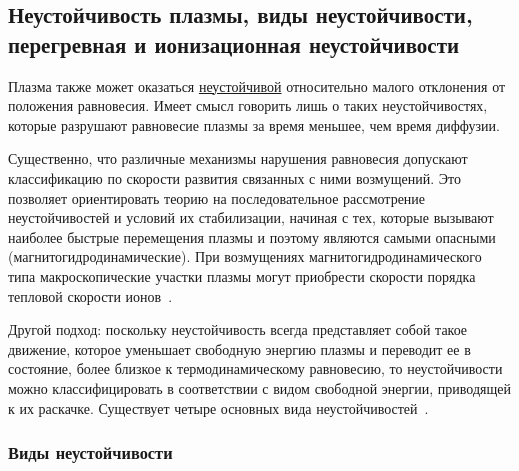 \documentclass[10pt, a4paper]{article}
\begin{document}
\subsection{Неустойчивость плазмы, виды неустойчивости, перегревная и ионизационная неустойчивости}

Плазма также может оказаться
\uline{неустойчивой} относительно малого отклонения от положения равновесия. Имеет смысл говорить лишь о таких неустойчивостях, которые разрушают равновесие плазмы за время меньшее, чем время диффузии.

Существенно, что различные механизмы нарушения равновесия допускают классификацию по скорости развития связанных с ними возмущений. Это позволяет ориентировать теорию на последовательное рассмотрение неустойчивостей и условий их стабилизации, начиная с тех, которые вызывают наиболее быстрые перемещения плазмы и поэтому являются самыми опасными (магнитогидродинамические). При возмущениях магнитогидродинамического типа макроскопические участки плазмы могут приобрести скорости порядка тепловой скорости ионов~\cite{arzimovich}. 

Другой подход: поскольку неустойчивость всегда представляет собой такое движение, которое уменьшает свободную энергию плазмы и переводит ее в состояние, более близкое к термодинамическому равновесию, то неустойчивости можно классифицировать в соответствии с видом свободной энергии, приводящей к их раскачке. Существует
четыре основных вида неустойчивостей~\cite{chen}.

\subsubsection{Виды неустойчивости} \label{subsubsec:instabilities}
\end{document}
